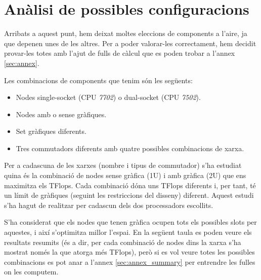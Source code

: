 \section{Anàlisi de possibles configuracions}\label{sec:analisi}

Arribats a aquest punt, hem deixat moltes eleccions de components a l'aire, ja que depenen unes de les altres. Per a poder valorar-les correctament, hem decidit provar-les totes amb l'ajut de fulls de càlcul que es poden trobar a l'annex \ref{sec:annex}.

Les combinacions de components que tenim són les següents:
\begin{itemize}
    \item {Nodes single-socket (CPU \textit{7702}) o dual-socket (CPU \textit{7502})}.
    \item {Nodes amb o sense gràfiques}.
    \item {Set gràfiques diferents}.
    \item {Tres commutadors diferents amb quatre possibles combinacions de xarxa}.
\end{itemize}



Per a cadascuna de les xarxes (nombre i tipus de commutador) s'ha estudiat quina és la combinació de nodes sense gràfica (1U) i amb gràfica (2U) que ens maximitza els TFlops. Cada combinació dóna uns TFlops diferents i, per tant, té un límit de gràfiques (seguint les restriccions del disseny) diferent. Aquest estudi s'ha hagut de realitzar per cadascun dels dos processadors escollits.

S'ha considerat que els nodes que tenen gràfica ocupen tots els possibles slots per aquestes, i així s'optimitza millor l'espai. En la següent taula es poden veure els resultats resumits (és a dir, per cada combinació de nodes dins la xarxa s'ha mostrat només la que atorga més TFlops), però si es vol veure totes les possibles combinacions es pot anar a l'annex \ref{sec:annex_summary} per entrendre les fulles on les computem.

